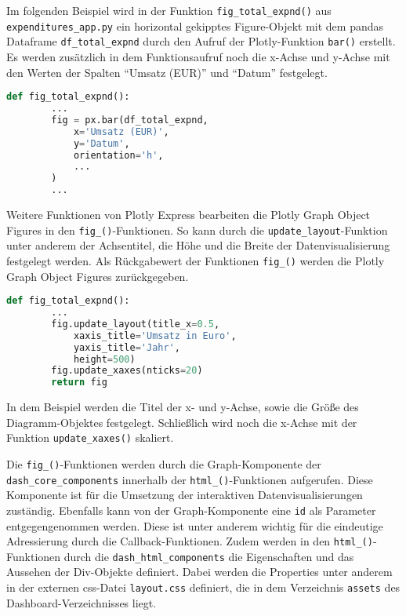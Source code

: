     Im folgenden Beispiel wird in der Funktion \texttt{fig\_total\_expnd()} aus \texttt{expenditures\_app.py} ein horizontal gekipptes Figure-Objekt
    mit dem pandas Dataframe \texttt{df\_total\_expnd} durch den Aufruf der Plotly-Funktion \texttt{bar()} erstellt. 
    Es werden zusätzlich in dem Funktionsaufruf noch die x-Achse und y-Achse mit den Werten der Spalten \enquote{Umsatz (EUR)} und \enquote{Datum} festgelegt. 

    \begin{lstlisting}[language=Python, caption=Funktion fig\_total\_expnd() Auszug 1]
    def fig_total_expnd():
        ...
        fig = px.bar(df_total_expnd,
            x='Umsatz (EUR)',
            y='Datum',
            orientation='h',
            ...
        )
        ...
    \end{lstlisting}
    
    Weitere Funktionen von Plotly Express bearbeiten die Plotly Graph Object Figures in den \texttt{fig\_()}-Funktionen. 
    So kann durch die \texttt{update\_layout}-Funktion unter anderem der Achsentitel, die Höhe und die Breite der Datenvisualisierung 
    festgelegt werden. Als Rückgabewert der Funktionen \texttt{fig\_()} werden die Plotly Graph Object Figures zurückgegeben.

    \begin{lstlisting}[language=Python, caption=fig\_total\_expnd() Auszug 2]  
    def fig_total_expnd():
        ...
        fig.update_layout(title_x=0.5,
            xaxis_title='Umsatz in Euro',
            yaxis_title='Jahr',
            height=500)
        fig.update_xaxes(nticks=20)         
        return fig
    \end{lstlisting}

    In dem Beispiel werden die Titel der x- und y-Achse, sowie die
    Größe des Diagramm-Objektes festgelegt. Schließlich wird noch die x-Achse mit der Funktion \texttt{update\_xaxes()} skaliert.
    
    Die \texttt{fig\_()}-Funktionen werden durch die Graph-Komponente der \texttt{dash\_core\_components} innerhalb der 
    \texttt{html\_()}-Funktionen aufgerufen. Diese Komponente ist für die Umsetzung der interaktiven Datenvisualisierungen 
    zuständig. Ebenfalls kann von der Graph-Komponente eine \texttt{id} als Parameter entgegengenommen werden. 
    Diese ist unter anderem wichtig für die eindeutige Adressierung durch die Callback-Funktionen.
    Zudem werden in den \texttt{html\_()}-Funktionen durch die \texttt{dash\_html\_components} die Eigenschaften und 
    das Aussehen der Div-Objekte definiert. 
    Dabei werden die Properties unter anderem in der externen css-Datei \texttt{layout.css} definiert, die in dem Verzeichnis \texttt{assets} 
    des Dashboard-Verzeichnisses liegt.

